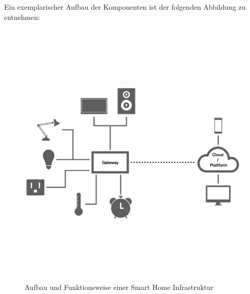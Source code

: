         Ein exemplarischer Aufbau der Komponenten ist der folgenden Abbildung zu entnehmen:
        \begin{figure}[hbt!]
            \centering
            \includegraphics[width=13cm,height=13cm,keepaspectratio]{images/smart_home_connection.png}
            \caption{Aufbau und Funktionsweise einer Smart Home Infrastruktur}
            \label{pic:aufbau_SH}
        \end{figure}

    
